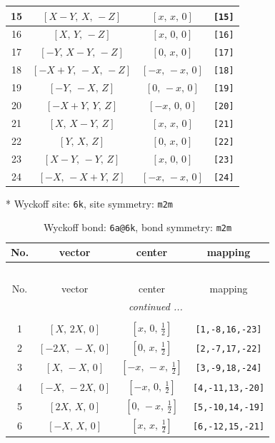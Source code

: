 \documentclass[fleqn,8pt]{jsarticle}
\begin{document}
\begin{longtable}{cccc}
15 & $\left[ X - Y,\, X,\, - Z \right]$ & $\left[ x,\, x,\, 0 \right]$ & {\tt [15]} \\ \hline
16 & $\left[ X,\, Y,\, - Z \right]$ & $\left[ x,\, 0,\, 0 \right]$ & {\tt [16]} \\ \hline
17 & $\left[ - Y,\, X - Y,\, - Z \right]$ & $\left[ 0,\, x,\, 0 \right]$ & {\tt [17]} \\ \hline
18 & $\left[ - X + Y,\, - X,\, - Z \right]$ & $\left[ - x,\, - x,\, 0 \right]$ & {\tt [18]} \\ \hline
19 & $\left[ - Y,\, - X,\, Z \right]$ & $\left[ 0,\, - x,\, 0 \right]$ & {\tt [19]} \\ \hline
20 & $\left[ - X + Y,\, Y,\, Z \right]$ & $\left[ - x,\, 0,\, 0 \right]$ & {\tt [20]} \\ \hline
21 & $\left[ X,\, X - Y,\, Z \right]$ & $\left[ x,\, x,\, 0 \right]$ & {\tt [21]} \\ \hline
22 & $\left[ Y,\, X,\, Z \right]$ & $\left[ 0,\, x,\, 0 \right]$ & {\tt [22]} \\ \hline
23 & $\left[ X - Y,\, - Y,\, Z \right]$ & $\left[ x,\, 0,\, 0 \right]$ & {\tt [23]} \\ \hline
24 & $\left[ - X,\, - X + Y,\, Z \right]$ & $\left[ - x,\, - x,\, 0 \right]$ & {\tt [24]} \\
\end{longtable}
* Wyckoff site: {\tt 6k}, site symmetry: {\tt m2m}
\renewcommand{\arraystretch}{1.2}
\begin{longtable}{cccc}
\caption{Wyckoff bond: {\tt 6a@6k}, bond symmetry: {\tt m2m}}
 \\
 \hline \hline
No. & vector & center & mapping \\ \hline \endfirsthead

\multicolumn{3}{l}{\tablename\ \thetable{}} \\
 \hline \hline
No. & vector & center & mapping \\ \hline \endhead

 \hline \hline
\multicolumn{3}{r}{\footnotesize\it continued ...} \\ \endfoot

 \hline \hline
\multicolumn{3}{r}{} \\ \endlastfoot

1 & $\left[ X,\, 2 X,\, 0 \right]$ & $\left[ x,\, 0,\, \frac{1}{2} \right]$ & {\tt [1,-8,16,-23]} \\ \hline
2 & $\left[ - 2 X,\, - X,\, 0 \right]$ & $\left[ 0,\, x,\, \frac{1}{2} \right]$ & {\tt [2,-7,17,-22]} \\ \hline
3 & $\left[ X,\, - X,\, 0 \right]$ & $\left[ - x,\, - x,\, \frac{1}{2} \right]$ & {\tt [3,-9,18,-24]} \\ \hline
4 & $\left[ - X,\, - 2 X,\, 0 \right]$ & $\left[ - x,\, 0,\, \frac{1}{2} \right]$ & {\tt [4,-11,13,-20]} \\ \hline
5 & $\left[ 2 X,\, X,\, 0 \right]$ & $\left[ 0,\, - x,\, \frac{1}{2} \right]$ & {\tt [5,-10,14,-19]} \\ \hline
6 & $\left[ - X,\, X,\, 0 \right]$ & $\left[ x,\, x,\, \frac{1}{2} \right]$ & {\tt [6,-12,15,-21]} \\
\end{longtable}
\end{document}
